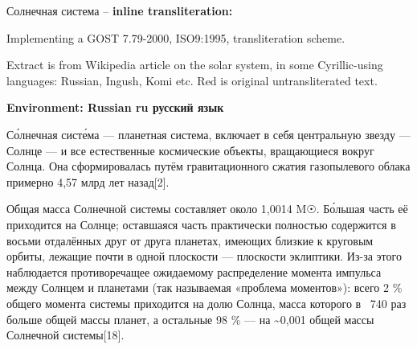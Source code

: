 \documentclass{article}
\begin{document}
{\forig Солнечная система -- \bfseries inline transliteration: } 

{\forig 
Implementing a GOST 7.79-2000, ISO9:1995, transliteration scheme.

Extract is from Wikipedia article on the solar system, in some Cyrillic-using languages: Russian, Ingush, Komi etc. Red is original untransliterated text.
}

\bigskip
{\forig \bfseries Environment: Russian ru русский язык }

\begin{cyrtranse}

Со́лнечная систе́ма — планетная система, включает в себя центральную звезду — Солнце — и все естественные космические объекты, вращающиеся вокруг Солнца. Она сформировалась путём гравитационного сжатия газопылевого облака примерно 4,57 млрд лет назад[2].

Общая масса Солнечной системы составляет около 1,0014 M☉. Бо́льшая часть её приходится на Солнце; оставшаяся часть практически полностью содержится в восьми отдалённых друг от друга планетах, имеющих близкие к круговым орбиты, лежащие почти в одной плоскости — плоскости эклиптики. Из-за этого наблюдается противоречащее ожидаемому распределение момента импульса между Солнцем и планетами (так называемая «проблема моментов»): всего 2 \% общего момента системы приходится на долю Солнца, масса которого в ~740 раз больше общей массы планет, а остальные 98 \% — на \textasciitilde 0,001 общей массы Солнечной системы[18]. 

\end{cyrtranse}



\end{document}
